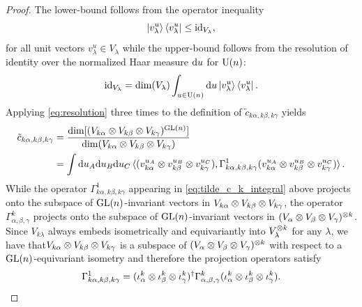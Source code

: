 \documentclass[notitlepage, 10pt]{article}
\begin{document}
\begin{proof}
    The lower-bound follows from the operator inequality
     \begin{equation}
         \label{eq:inclusivity}
         \ket{v_{\lambda}^{u}}\bra{v_{\lambda}^{u}} \leq \operatorname{id}_{V_{\lambda}},
    \end{equation}
    for all unit vectors $v_{\lambda}^{u} \in V_{\lambda}$ while the upper-bound follows from the resolution of identity over the normalized Haar measure $\mathrm{d} u$ for $\operatorname{U}(n)$:
    \begin{equation}
        \label{eq:resolution}
        \operatorname{id}_{V_{\lambda}} = \dim(V_{\lambda}) \int_{u\in\operatorname{U}(n)} \mathrm{d} u \ket{v_{\lambda}^{u}}\bra{v_{\lambda}^{u}}.
    \end{equation}
    Applying \cref{eq:resolution} three times to the definition of $\tilde c_{k\alpha,k\beta,k\gamma}$ yields
    \begin{align}
        \label{eq:tilde_c_k_integral}
        \begin{split}
            \tilde c_{k\alpha, k\beta, k\gamma} 
            &= \frac{\dim[(V_{k\alpha} \otimes V_{k\beta} \otimes V_{k\gamma})^{\operatorname{GL}(n)}]}{\dim(V_{k\alpha} \otimes V_{k\beta} \otimes V_{k\gamma})} \\
            &= \int \mathrm{d} u_A \mathrm{d} u_B \mathrm{d} u_C \braket{(v_{k\alpha}^{u_A} \otimes v_{k\beta}^{u_B} \otimes v_{k\gamma}^{u_C}), \Gamma_{k\alpha,k\beta,k\gamma}^{1} (v_{k\alpha}^{u_A} \otimes v_{k\beta}^{u_B} \otimes v_{k\gamma}^{u_C})}.
        \end{split}
    \end{align}
    While the operator $\Gamma_{k\alpha,k\beta,k\gamma}^{1}$ appearing in \cref{eq:tilde_c_k_integral} above projects onto the subspace of $\operatorname{GL}(n)$-invariant vectors in $V_{k\alpha}\otimes V_{k\beta} \otimes V_{k\gamma}$, the operator $\Gamma_{\alpha,\beta,\gamma}^{k}$ projects onto the subspace of $\operatorname{GL}(n)$-invariant vectors in $(V_{\alpha}\otimes V_{\beta} \otimes V_{\gamma})^{\otimes k}$.
    Since $V_{k\lambda}$ always embeds isometrically and equivariantly into $V_{\lambda}^{\otimes k}$ for any $\lambda$, we have that$V_{k\alpha}\otimes V_{k\beta} \otimes V_{k\gamma}$ is a subspace of $(V_{\alpha}\otimes V_{\beta} \otimes V_{\gamma})^{\otimes k}$ with respect to a $\operatorname{GL}(n)$-equivariant isometry and therefore the projection operators satisfy
    \begin{equation}
        \Gamma_{k\alpha,k\beta,k\gamma}^{1} = (\iota_{\alpha}^{k}\ot\iota_{\beta}^{k}\ot\iota_{\gamma}^{k})^{\dagger} \Gamma_{\alpha,\beta,\gamma}^{k} (\iota_{\alpha}^{k}\ot\iota_{\beta}^{k}\ot\iota_{\gamma}^{k}).

\end{equation}
\end{proof}
\end{document}
